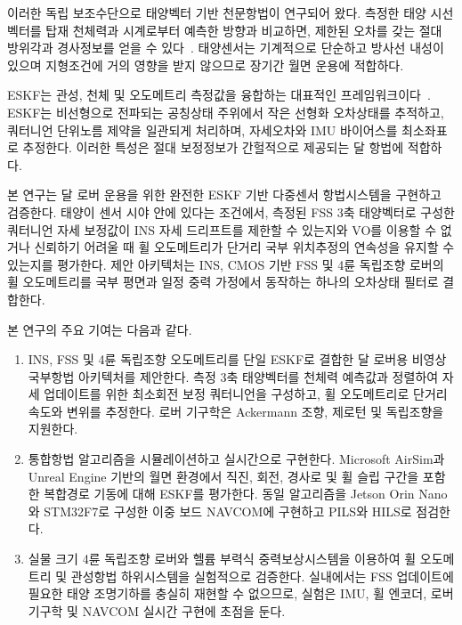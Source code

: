 \documentclass[]{IAC_style}
\begin{document}
이러한 독립 보조수단으로 태양벡터 기반 천문항법이 연구되어 왔다. 측정한 태양 시선벡터를 탑재 천체력과 시계로부터 예측한 방향과 비교하면, 제한된 오차를 갖는 절대 방위각과 경사정보를 얻을 수 있다~\cite{ilyas2016integrated,rhee2007satellite}. 태양센서는 기계적으로 단순하고 방사선 내성이 있으며 지형조건에 거의 영향을 받지 않으므로 장기간 월면 운용에 적합하다.

ESKF는 관성, 천체 및 오도메트리 측정값을 융합하는 대표적인 프레임워크이다~\cite{lefferts1982kalman,sola2017quaternion,sveinsson2012insgps,groves2013principles}. ESKF는 비선형으로 전파되는 공칭상태 주위에서 작은 선형화 오차상태를 추적하고, 쿼터니언 단위노름 제약을 일관되게 처리하며, 자세오차와 IMU 바이어스를 최소좌표로 추정한다. 이러한 특성은 절대 보정정보가 간헐적으로 제공되는 달 항법에 적합하다.

본 연구는 달 로버 운용을 위한 완전한 ESKF 기반 다중센서 항법시스템을 구현하고 검증한다. 태양이 센서 시야 안에 있다는 조건에서, 측정된 FSS 3축 태양벡터로 구성한 쿼터니언 자세 보정값이 INS 자세 드리프트를 제한할 수 있는지와 VO를 이용할 수 없거나 신뢰하기 어려울 때 휠 오도메트리가 단거리 국부 위치추정의 연속성을 유지할 수 있는지를 평가한다. 제안 아키텍처는 INS, CMOS 기반 FSS 및 4륜 독립조향 로버의 휠 오도메트리를 국부 평면과 일정 중력 가정에서 동작하는 하나의 오차상태 필터로 결합한다.

본 연구의 주요 기여는 다음과 같다.

\begin{enumerate}[label=(\roman*)]

\item INS, FSS 및 4륜 독립조향 오도메트리를 단일 ESKF로 결합한 달 로버용 비영상 국부항법 아키텍처를 제안한다. 측정 3축 태양벡터를 천체력 예측값과 정렬하여 자세 업데이트를 위한 최소회전 보정 쿼터니언을 구성하고, 휠 오도메트리로 단거리 속도와 변위를 추정한다. 로버 기구학은 Ackermann 조향, 제로턴 및 독립조향을 지원한다.

\item 통합항법 알고리즘을 시뮬레이션하고 실시간으로 구현한다. Microsoft AirSim과 Unreal Engine 기반의 월면 환경에서 직진, 회전, 경사로 및 휠 슬립 구간을 포함한 복합경로 기동에 대해 ESKF를 평가한다. 동일 알고리즘을 Jetson Orin Nano와 STM32F7로 구성한 이중 보드 NAVCOM에 구현하고 PILS와 HILS로 점검한다.

\item 실물 크기 4륜 독립조향 로버와 헬륨 부력식 중력보상시스템을 이용하여 휠 오도메트리 및 관성항법 하위시스템을 실험적으로 검증한다. 실내에서는 FSS 업데이트에 필요한 태양 조명기하를 충실히 재현할 수 없으므로, 실험은 IMU, 휠 엔코더, 로버 기구학 및 NAVCOM 실시간 구현에 초점을 둔다.

\end{enumerate}
\end{document}
